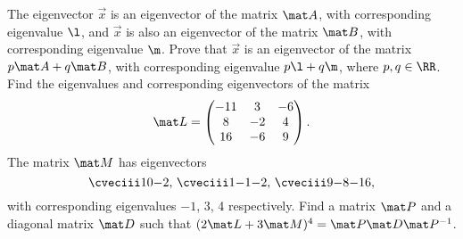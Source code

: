 \begin{problem}
    The eigenvector $\vec x$ is an eigenvector of the matrix $\mat A$, with corresponding eigenvalue $\l$, and $\vec x$ is also an eigenvector of the matrix $\mat B$, with corresponding eigenvalue $\m$. Prove that $\vec x$ is an eigenvector of the matrix $p\mat A + q \mat B$, with corresponding eigenvalue $p \l + q \m$, where $p, q \in \RR$. Find the eigenvalues and corresponding eigenvectors of the matrix \[\mat L = \begin{pmatrix}-11 & 3 & -6 \\ 8 & -2 & 4 \\ 16 & -6 & 9\end{pmatrix}.\] The matrix $\mat M$ has eigenvectors \[\cveciii10{-2}, \, \cveciii1{-1}{-2}, \, \cveciii9{-8}{-16},\] with corresponding eigenvalues $-1$, 3, 4 respectively. Find a matrix $\mat P$ and a diagonal matrix $\mat D$ such that $(2\mat L + 3\mat M)^4 = \mat P \mat D \mat P^{-1}$.
\end{problem}

